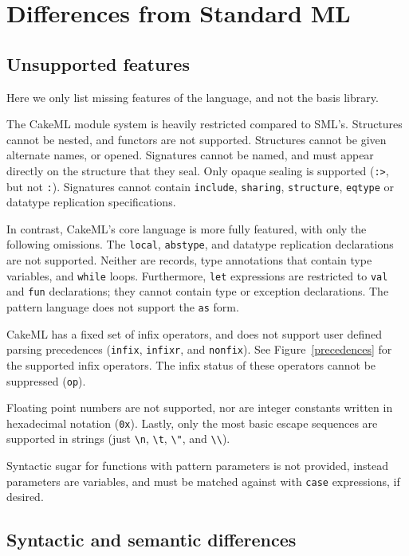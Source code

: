 \documentclass[12pt,a4paper]{book}
\begin{document}
\section{Differences from Standard ML}

\subsection{Unsupported features}
Here we only list missing features of the language, and not the basis library.

The CakeML module system is heavily restricted compared to SML's. Structures cannot be nested, and functors are not supported. Structures cannot be given alternate names, or opened. Signatures cannot be named, and must appear directly on the structure that they seal. Only opaque sealing is supported (\texttt{:>}, but not \texttt{:}). Signatures cannot contain \texttt{include}, \texttt{sharing}, \texttt{structure}, \texttt{eqtype} or datatype replication specifications.

In contrast, CakeML's core language is more fully featured, with only the following omissions. The \texttt{local}, \texttt{abstype}, and datatype replication declarations are not supported. Neither are records, type annotations that contain type variables, and \texttt{while} loops. Furthermore, \texttt{let} expressions are restricted to \texttt{val} and \texttt{fun} declarations; they cannot contain type or exception declarations. The pattern language does not support the \texttt{as} form.

CakeML has a fixed set of infix operators, and does not support user defined parsing precedences (\texttt{infix}, \texttt{infixr}, and \texttt{nonfix}). See Figure~\ref{precedences} for the supported infix operators. The infix status of these operators cannot be suppressed (\texttt{op}).

Floating point numbers are not supported, nor are integer constants written in hexadecimal notation (\texttt{0x}). Lastly, only the most basic escape sequences are supported in strings (just \texttt{\textbackslash n}, \texttt{\textbackslash t}, \texttt{\textbackslash "}, and \texttt{\textbackslash\textbackslash}).

Syntactic sugar for functions with pattern parameters is not provided, instead parameters are variables, and must be matched against with \texttt{case} expressions, if desired.

\subsection{Syntactic and semantic differences}
\end{document}
